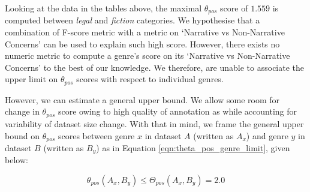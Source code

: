 Looking at the data in the tables above, the maximal $\theta_{pos}$ score of $1.559$ is computed between \textit{legal} and \textit{fiction} categories. We hypothesise that a combination of F-score metric with a metric on `Narrative vs Non-Narrative Concerns' can be used to explain such high score. However, there exists no numeric metric to compute a genre's score on its `Narrative vs Non-Narrative Concerns' to the best of our knowledge. We therefore, are unable to associate the upper limit on $\theta_{pos}$ scores with respect to individual genres.

However, we can estimate a general upper bound. We allow some room for change in $\theta_{pos}$ score owing to high quality of annotation as while accounting for variability of dataset size change. With that in mind, we frame the general upper bound on $\theta_{pos}$ scores between genre $x$ in dataset $A$ (written as $A_{x}$) and genre $y$ in dataset $B$ (written as $B_{y}$) as in Equation \ref{eqn:theta_pos_genre_limit}, given below:

\begin{equation}
    \boxed{\theta_{pos}(A_{x}, B_{y}) \leq \Theta_{pos}(A_{x}, B_{y}) = 2.0}
\label{eqn:theta_pos_genre_limit}
\end{equation}
\newpage